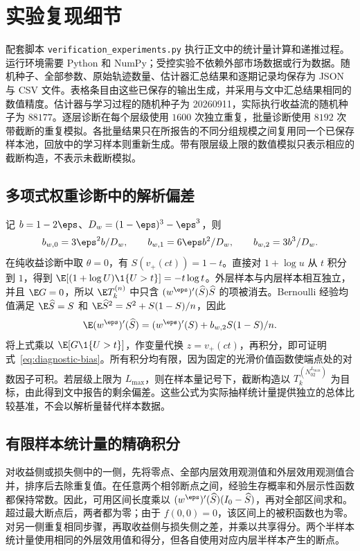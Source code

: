 \section{实验复现细节}\label{app:experiments}

配套脚本 \texttt{verification\_experiments.py} 执行正文中的统计量计算和递推过程。运行环境需要 Python 和 NumPy；受控实验不依赖外部市场数据或行为数据。随机种子、全部参数、原始轨迹数量、估计器汇总结果和逐期记录均保存为 JSON 与 CSV 文件。表格条目由这些已保存的输出生成，并采用与文中汇总结果相同的数值精度。估计器与学习过程的随机种子为 20260911，实际执行收益流的随机种子为 $88177$。逐层诊断在每个层级使用 $1600$ 次独立重复，批量诊断使用 $8192$ 次带截断的重复模拟。各批量结果只在所报告的不同分组规模之间复用同一个已保存样本池，回放中的学习样本则重新生成。带有限层级上限的数值模拟只表示相应的截断构造，不表示未截断模拟。

\subsection{多项式权重诊断中的解析偏差}
记 $b=1-2\eps$、$D_w=(1-\eps)^3-\eps^3$，则
\[
 b_{w,0}=3\eps^2b/D_w,\qquad b_{w,1}=6\eps b^2/D_w,
 \qquad b_{w,2}=3b^3/D_w.
\]
在纯收益诊断中取 $\theta=0$，有 $S(v_+(ct))=1-t$。直接对 $1+\log u$ 从 $t$ 积分到 $1$，得到
$\E[(1+\log U)\1\{U>t\}]=-t\log t$。外层样本与内层样本相互独立，并且 $\E G=0$，所以 $\E T_k^{(n)}$ 中只含 $(w^\eps)'(\widehat S)\widehat S$ 的项被消去。Bernoulli 经验均值满足 $\E\widehat S=S$ 和 $\E\widehat S^2=S^2+S(1-S)/n$，因此
\[
 \E (w^\eps)'(\widehat S)=(w^\eps)'(S)+b_{w,2}S(1-S)/n.
\]
将上式乘以 $\E[G\1\{U>t\}]$，作变量代换 $z=v_+(ct)$，再积分，即可证明式~\eqref{eq:diagnostic-bias}。所有积分均有限，因为固定的光滑价值函数使端点处的对数因子可积。若层级上限为 $L_{\max}$，则在样本量记号下，截断构造以 $T_k^{(N_02^{L_{\max}})}$ 为目标，由此得到文中报告的剩余偏差。这些公式为实际抽样统计量提供独立的总体比较基准，不会以解析量替代样本数据。

\subsection{有限样本统计量的精确积分}
对收益侧或损失侧中的一侧，先将零点、全部内层效用观测值和外层效用观测值合并，排序后去除重复值。在任意两个相邻断点之间，经验生存概率和外层示性函数都保持常数。因此，可用区间长度乘以 $(w^\eps)'(\widehat S)(I_0-\widehat S)$，再对全部区间求和。超过最大断点后，两者都为零；由于 $f(0,0)=0$，该区间上的被积函数也为零。对另一侧重复相同步骤，再取收益侧与损失侧之差，并乘以共享得分。两个半样本统计量使用相同的外层效用值和得分，但各自使用对应内层半样本产生的断点。

